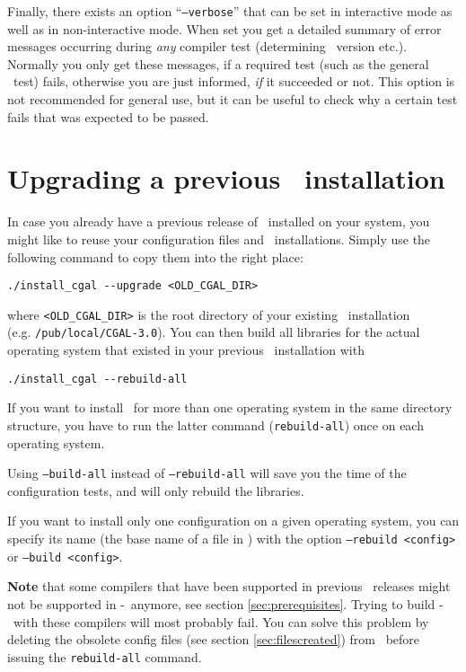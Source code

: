 Finally, there exists an option
``\texttt{--verbose}'' that
can be set in interactive mode as well as in non-interactive mode.
When set you get a detailed summary of error messages occurring during
\textit{any} compiler test (determining \stl\ version etc.). Normally
you only get these messages, if a required test (such as the general
\stl\ test) fails, otherwise you are just informed, \textit{if} it
succeeded or not.  This option is not recommended for general use, but
it can be useful to check why a certain test fails that was expected
to be passed.

\section{Upgrading a previous \cgal\ installation}
\label{sec:upgrade}

In case you already have a previous release of \cgal\ installed on
your system, you might like to reuse your configuration files and
\gmp\ installations. Simply use the following command to copy them
into the right place:
\begin{verbatim}
./install_cgal --upgrade <OLD_CGAL_DIR>
\end{verbatim}
where \texttt{<OLD\_CGAL\_DIR>} is the root directory of your existing
\cgal\ installation\\ (e.g. \texttt{/pub/local/CGAL-3.0}).  You can
then build all libraries for the actual operating system that existed
in your previous \cgal\ installation with
\begin{verbatim}
./install_cgal --rebuild-all
\end{verbatim}

If you want to install \cgal\ for more than one operating system in
the same directory structure, you have to run the latter command
(\texttt{rebuild-all}) once on each operating system.

Using \texttt{--build-all} instead of \texttt{--rebuild-all} will save
you the time of the configuration tests, and will only rebuild the libraries.

If you want to install only one configuration on a given operating system,
you can specify its name (the base name of a file in \cgalinstconfdir) with
the option \texttt{--rebuild <config>} or \texttt{--build <config>}.

\textbf{Note} that some compilers that have been supported in previous
\cgal\ releases might not be supported in \cgal-\cgalrelease\ anymore,
see section \ref{sec:prerequisites}. Trying to build
\cgal-\cgalrelease\ with these compilers will most probably fail. You
can solve this problem by deleting the obsolete config files (see
section \ref{sec:filescreated}) from \cgalinstconfdir\ before issuing
the \texttt{rebuild-all} command.


